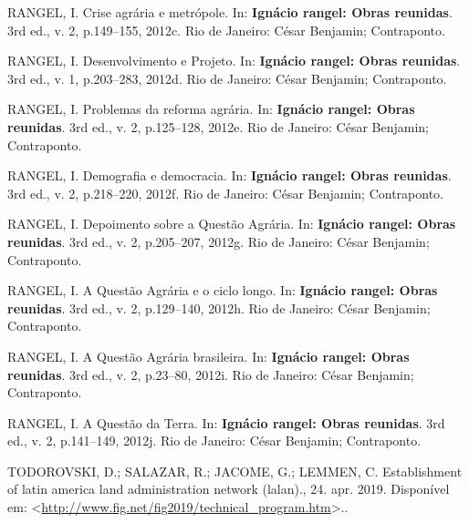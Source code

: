 \documentclass[a4paper, 12pt]{article}
\begin{document}
\leavevmode\hypertarget{ref-rangel1986a}{}%
RANGEL, I. Crise agrária e metrópole. In: \textbf{Ignácio rangel: Obras
reunidas}. 3rd ed., v. 2, p.149--155, 2012c. Rio de Janeiro: César
Benjamin; Contraponto.

\leavevmode\hypertarget{ref-rangel1956}{}%
RANGEL, I. Desenvolvimento e Projeto. In: \textbf{Ignácio rangel: Obras
reunidas}. 3rd ed., v. 1, p.203--283, 2012d. Rio de Janeiro: César
Benjamin; Contraponto.

\leavevmode\hypertarget{ref-rangel1985}{}%
RANGEL, I. Problemas da reforma agrária. In: \textbf{Ignácio rangel:
Obras reunidas}. 3rd ed., v. 2, p.125--128, 2012e. Rio de Janeiro: César
Benjamin; Contraponto.

\leavevmode\hypertarget{ref-rangel1961}{}%
RANGEL, I. Demografia e democracia. In: \textbf{Ignácio rangel: Obras
reunidas}. 3rd ed., v. 2, p.218--220, 2012f. Rio de Janeiro: César
Benjamin; Contraponto.

\leavevmode\hypertarget{ref-rangel1960}{}%
RANGEL, I. Depoimento sobre a Questão Agrária. In: \textbf{Ignácio
rangel: Obras reunidas}. 3rd ed., v. 2, p.205--207, 2012g. Rio de
Janeiro: César Benjamin; Contraponto.

\leavevmode\hypertarget{ref-rangel1986b}{}%
RANGEL, I. A Questão Agrária e o ciclo longo. In: \textbf{Ignácio
rangel: Obras reunidas}. 3rd ed., v. 2, p.129--140, 2012h. Rio de
Janeiro: César Benjamin; Contraponto.

\leavevmode\hypertarget{ref-rangel1962}{}%
RANGEL, I. A Questão Agrária brasileira. In: \textbf{Ignácio rangel:
Obras reunidas}. 3rd ed., v. 2, p.23--80, 2012i. Rio de Janeiro: César
Benjamin; Contraponto.

\leavevmode\hypertarget{ref-rangel1986c}{}%
RANGEL, I. A Questão da Terra. In: \textbf{Ignácio rangel: Obras
reunidas}. 3rd ed., v. 2, p.141--149, 2012j. Rio de Janeiro: César
Benjamin; Contraponto.

\leavevmode\hypertarget{ref-lalan}{}%
TODOROVSKI, D.; SALAZAR, R.; JACOME, G.; LEMMEN, C. Establishment of
latin america land administration network (lalan)., 24. apr. 2019.
Disponível em:
\textless{}\url{http://www.fig.net/fig2019/technical_program.htm}\textgreater{}..
\end{document}
